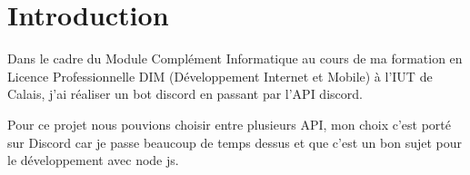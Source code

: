 \section{Introduction}

    Dans le cadre du Module Complément Informatique au cours de ma formation en Licence
Professionnelle DIM (Développement Internet et Mobile) à l'IUT de Calais, j'ai réaliser un bot discord en passant par l'API discord.

    Pour ce projet nous pouvions choisir entre plusieurs API, mon choix c'est porté sur
Discord car je passe beaucoup de temps dessus et que c'est un bon sujet pour le développement avec node js.